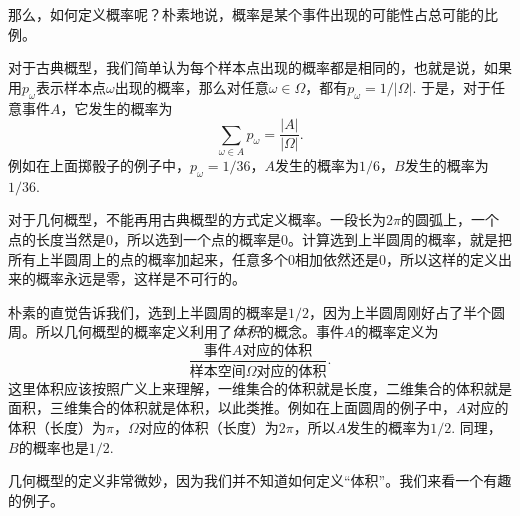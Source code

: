 那么，如何定义概率呢？朴素地说，概率是某个事件出现的可能性占总可能的比例。

对于古典概型，我们简单认为每个样本点出现的概率都是相同的，也就是说，如果用$p_\omega$表示样本点$\omega$出现的概率，那么对任意$\omega\in\Omega$，都有$p_\omega = 1/|\Omega|$. 于是，对于任意事件$A$，它发生的概率为
\[
    \sum_{\omega\in A} p_\omega = \frac{|A|}{|\Omega|}.
\]
例如在上面掷骰子的例子中，$p_\omega=1/36$，$A$发生的概率为$1/6$，$B$发生的概率为$1/36$.

对于几何概型，不能再用古典概型的方式定义概率。一段长为$2\pi$的圆弧上，一个点的长度当然是$0$，所以选到一个点的概率是$0$。计算选到上半圆周的概率，就是把所有上半圆周上的点的概率加起来，任意多个$0$相加依然还是$0$，所以这样的定义出来的概率永远是零，这样是不可行的。

朴素的直觉告诉我们，选到上半圆周的概率是$1/2$，因为上半圆周刚好占了半个圆周。所以几何概型的概率定义利用了\emph{体积}的概念。事件$A$的概率定义为
\[
    \frac{\text{事件$A$对应的体积}}{\text{样本空间$\Omega$对应的体积}}.
\]
这里体积应该按照广义上来理解，一维集合的体积就是长度，二维集合的体积就是面积，三维集合的体积就是体积，以此类推。例如在上面圆周的例子中，$A$对应的体积（长度）为$\pi$，$\Omega$对应的体积（长度）为$2\pi$，所以$A$发生的概率为$1/2$. 同理，$B$的概率也是$1/2$.

几何概型的定义非常微妙，因为我们并不知道如何定义“体积”。我们来看一个有趣的例子。

